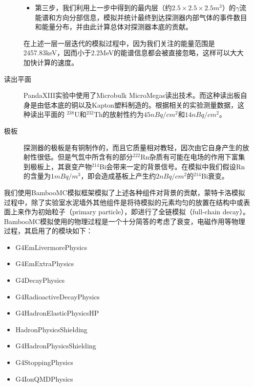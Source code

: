\begin{description}
\begin{itemize}
        \item 第三步，我们利用上一步中得到的最内层（约$2.5\times2.5\times2.5m^3$）的$\gamma$流能谱和方向分部信息，模拟并统计最终到达探测器内部气体的事件数目和能量分布，并由此计算总体对探测器本底的贡献。
    \end{itemize}
    在上述一层一层迭代的模拟过程中，因为我们关注的能量范围是2457.83keV，因而小于2.2MeV的能谱信息都会被直接忽略，这样可以大大加快计算的速度。
    \item[读出平面]PandaXIII实验中使用了Microbulk MicroMegas读出技术。而这种读出板自身是由低本底的铜以及Kapton塑料制造的。根据相关的实验测量数据，这种读出平面的
    $^{238}$U和$^{232}$Th的放射性约为$45nBq/cm^2$和$14nBq/cm^2$。
    \item[极板]探测器的极板是有铜制作的，而且它质量相对教轻，因次由它自身产生的放射性很低。但是气氙中所含有的部分$^{222}$Rn杂质有可能在电场的作用下富集到极板上，其衰变产物$^{214}$Bi会带来一定的背景信号。在模拟中我们假设Rn的含量为$1mBq/m^3$，即会造成基板上产生约$2nBq/cm^2$的$^{214}$Bi衰变。
\end{description}

我们使用BambooMC模拟框架模拟了上述各种组件对背景的贡献，蒙特卡洛模拟过程中，除了实验室水泥墙外其他组件是将待模拟的元素均匀的放置在结构中或表面上来作为初始粒子（primary particle），即进行了全链模拟（full-chain decay）。BambooMC模拟使用的物理过程是一个十分简答的考虑了衰变，电磁作用等物理过程，其启用了的模块如下：
\begin{itemize}
    \item G4EmLivermorePhysics
    \item G4EmExtraPhysics
    \item G4DecayPhysics
    \item G4RadioactiveDecayPhysics
    \item G4HadronElasticPhysicsHP
    \item HadronPhysicsShielding
    \item G4HadronPhysicsShielding
    \item G4StoppingPhysics
    \item G4IonQMDPhysics     
\end{itemize}

